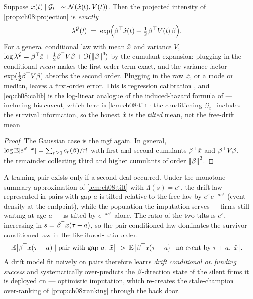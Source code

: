 \begin{proposition}\label{prop:ch08:calibration}
Suppose $x(t) \mid \mathcal{G}_{t^-} \sim \mathcal{N}(\hat{x}(t),
V(t))$. Then the projected intensity of \cref{prop:ch08:projection} is
\emph{exactly}
\begin{equation}\label{eq:ch08:calib}
\lambda^{\mathcal{G}}(t)
 \;=\;
 \exp\!\Big(\beta^{\top}\hat{x}(t) + \tfrac12\,\beta^{\top} V(t)\,\beta\Big).
\end{equation}
For a general conditional law with mean $\hat{x}$ and variance $V$,
$\log\lambda^{\mathcal{G}} = \beta^{\top}\hat{x} + \tfrac12\beta^{\top} V \beta
+ O(\left\lVert\beta\right\rVert^3)$ by the cumulant expansion: plugging in the
conditional \emph{mean} makes the first-order term exact, and the
variance factor $\exp(\tfrac12\beta^{\top} V\beta)$ absorbs the second
order. Plugging in the raw $\tilde{x}$, or a mode or median, leaves a
first-order error. This is regression calibration
\citep[Ch.~4]{carroll2006}, and \cref{eq:ch08:calib} is the log-linear
analogue of the induced-hazard formula of \citet{prentice1982} ---
including his caveat, which here is \cref{lem:ch08:tilt}: the
conditioning $\mathcal{G}_{t^-}$ includes the survival information, so
the honest $\hat{x}$ is the \emph{tilted} mean, not the free-drift
mean.
\end{proposition}

\begin{proof}
The Gaussian case is the mgf again. In general, $\log\mathbb{E}[e^{\beta^{\top}
x}] = \sum_{r\ge1} c_r(\beta)/r!$ with first and second
cumulants $\beta^{\top}\hat{x}$ and $\beta^{\top} V\beta$, the remainder
collecting third and higher cumulants of order $\left\lVert\beta\right\rVert^3$.
\end{proof}

\begin{proposition}\label{prop:ch08:selection}
A training pair exists only if a second deal occurred. Under the
monotone-summary approximation of \cref{lem:ch08:tilt} with
$\Lambda(s)=e^s$, the drift law represented in pairs with gap $a$ is
tilted relative to the free law by
$e^{s}\,e^{-a e^{s}}$ (event density at the endpoint), while the
population the imputation serves --- firms still waiting at age $a$ ---
is tilted by $e^{-a e^{s}}$ alone. The ratio of the two tilts is
$e^{s}$, increasing in $s = \beta^{\top}x(\tau + a)$, so the
pair-conditioned law dominates the survivor-conditioned law in the
likelihood-ratio order:
\[
\mathbb{E}\big[\beta^{\top}x(\tau+a) \mid \text{pair with gap } a,\ \tilde x\big]
\;>\;
\mathbb{E}\big[\beta^{\top}x(\tau+a) \mid \text{no event by } \tau + a,\ \tilde
x\big].
\]
A drift model fit naively on pairs therefore learns \emph{drift
conditional on funding success} and systematically over-predicts the
$\beta$-direction state of the silent firms it is deployed on ---
optimistic imputation, which re-creates the stale-champion over-ranking
of \cref{prop:ch08:ranking} through the back door.
\end{proposition}

